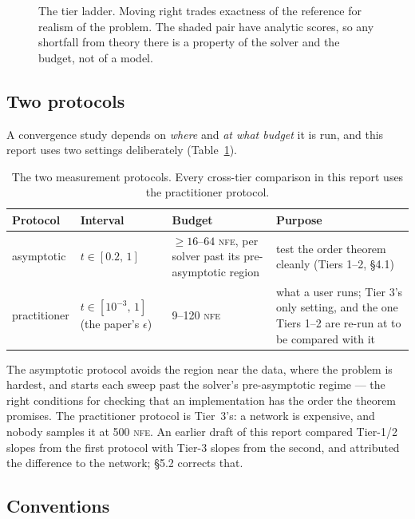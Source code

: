 \documentclass[11pt,a4paper]{article}
\newcommand{\NFE}{\textsc{nfe}}
\begin{document}
\begin{figure}[t]
\caption{The tier ladder. Moving right trades exactness of the reference for
realism of the problem. The shaded pair have analytic scores, so any shortfall
from theory there is a property of the solver and the budget, not of a model.}
\label{fig:tiers}
\end{figure}

\subsection{Two protocols}

A convergence study depends on \emph{where} and \emph{at what budget} it is run,
and this report uses two settings deliberately (Table~\ref{tab:protocols}).

\begin{table}[h]
\centering
\caption{The two measurement protocols. Every cross-tier comparison in this
report uses the practitioner protocol.}
\label{tab:protocols}
\small
\begin{tabular}{lp{3.4cm}p{3.3cm}p{5.2cm}}
\toprule
Protocol & Interval & Budget & Purpose \\
\midrule
asymptotic   & $t\in[0.2,\,1]$         & $\ge 16$--$64$ \NFE, per solver past its pre-asymptotic region & test the order theorem cleanly (Tiers 1--2, \S4.1) \\
practitioner & $t\in[10^{-3},\,1]$ (the paper's $\epsilon$) & 9--120 \NFE & what a user runs; Tier 3's only setting, and the one Tiers 1--2 are re-run at to be compared with it \\
\bottomrule
\end{tabular}
\end{table}

The asymptotic protocol avoids the region near the data, where the problem is
hardest, and starts each sweep past the solver's pre-asymptotic regime --- the
right conditions for checking that an implementation has the order the theorem
promises. The practitioner protocol is Tier~3's: a network is expensive, and
nobody samples it at 500 \NFE. An earlier draft of this report compared Tier-1/2
slopes from the first protocol with Tier-3 slopes from the second, and attributed
the difference to the network; \S5.2 corrects that.

\subsection{Conventions}
\end{document}
